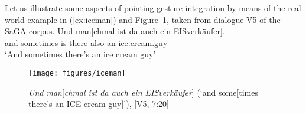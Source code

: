 \documentclass[output=paper
 	        ,biblatex
                ,babelshorthands
                ,newtxmath
                ,draftmode
                ,colorlinks, citecolor=brown
]{langscibook}
\begin{document}
Let us illustrate some aspects of pointing gesture integration by means of the real world example in (\ref{ex:iceman}) and Figure~\ref{fig:iceman}, taken from dialogue V5 of the SaGA corpus. %
%
\ea \label{ex:iceman}
\gll Und man[chmal ist da auch ein {EISverkäufer}]. \\
     and sometimes is there also an ice.cream.guy \\
\glt \enquote*{And sometimes there's an ice cream guy}
\z 

\begin{figure}[tb]
  \centering
  \texttt{[image: figures/iceman]}
  \caption[Ice cream guy]{\textit{Und man}[\textit{chmal ist da auch ein EISverkäufer}] (\enquote*{and some[times there's an ICE cream guy]}), [V5, 7:20]}
  \label{fig:iceman}
\end{figure}
\end{document}
